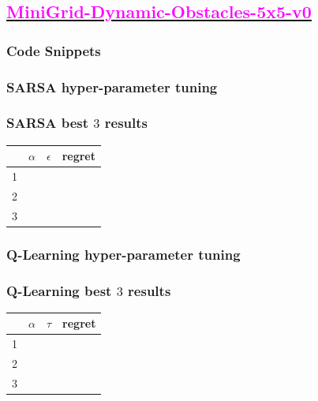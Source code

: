 \documentclass[11pt, a4]{article}
\begin{document}
		\subsection{\href{https://github.com/RitabrataMandal/RL-DA6400-assignment_1/tree/main/minigrid_world}{\textcolor{magenta}{MiniGrid-Dynamic-Obstacles-5x5-v0}}}
			\subsubsection{Code Snippets}
				
				
				
				
			\subsubsection{SARSA hyper-parameter tuning}
			\subsubsection{SARSA best $3$ results}
				\begin{center}
					\begin{tabular}{|c|c|c|c|}
						\hline
						& $\alpha$ & $\epsilon$ & regret\\
						\hline
						1 &  & &\\
						\hline
						2 & & &\\
						\hline
						3 & & &\\
						\hline
					\end{tabular}
				\end{center}
			\subsubsection{Q-Learning hyper-parameter tuning}
			\subsubsection{Q-Learning best $3$ results}
				\begin{center}
					\begin{tabular}{|c|c|c|c|}
						\hline
						& $\alpha$ & $\tau$ & regret\\
						\hline
						1 &  & &\\
						\hline
						2 & & &\\
						\hline
						3 & & &\\
						\hline
					\end{tabular}
				\end{center}
\end{document}
